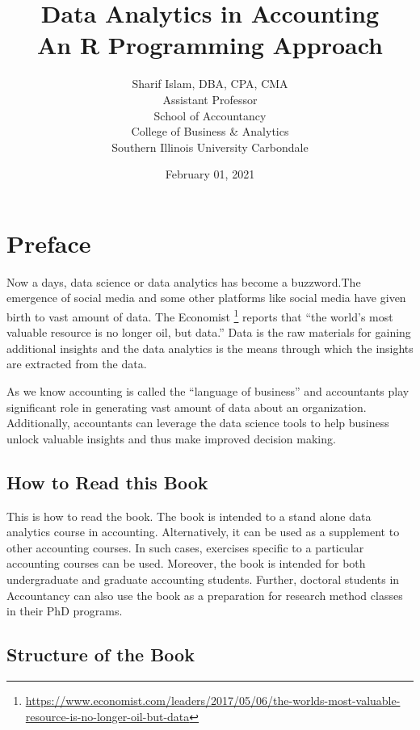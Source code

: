 \documentclass[
]{book}
\title{Data Analytics in Accounting\\
An R Programming Approach}
\author{Sharif Islam, DBA, CPA, CMA\\
Assistant Professor\\
School of Accountancy\\
College of Business \& Analytics\\
Southern Illinois University Carbondale}
\date{February 01, 2021}
\begin{document}
\maketitle

{
\hypersetup{linkcolor=blue}
\setcounter{tocdepth}{2}
\tableofcontents
}
\listoftables
\listoffigures
\hypertarget{preface}{%
\chapter*{Preface}\label{preface}}


\renewcommand{\chaptermark}[1]{\markboth{\uppercase{#1}}{\uppercase{#1}}}

Now a days, data science or data analytics has become a buzzword.The emergence of social media and some other platforms like social media have given birth to vast amount of data. The Economist \footnote{\url{https://www.economist.com/leaders/2017/05/06/the-worlds-most-valuable-resource-is-no-longer-oil-but-data}} reports that ``the world's most valuable resource is no longer oil, but data.'' Data is the raw materials for gaining additional insights and the data analytics is the means through which the insights are extracted from the data.

As we know accounting is called the ``language of business'' and accountants play significant role in generating vast amount of data about an organization. Additionally, accountants can leverage the data science tools to help business unlock valuable insights and thus make improved decision making.

\hypertarget{how-to-read-this-book}{%
\section*{How to Read this Book}\label{how-to-read-this-book}}


This is how to read the book. The book is intended to a stand alone data analytics course in accounting. Alternatively, it can be used as a supplement to other accounting courses. In such cases, exercises specific to a particular accounting courses can be used. Moreover, the book is intended for both undergraduate and graduate accounting students. Further, doctoral students in Accountancy can also use the book as a preparation for research method classes in their PhD programs.

\hypertarget{structure-of-the-book}{%
\section*{Structure of the Book}\label{structure-of-the-book}}
\end{document}
